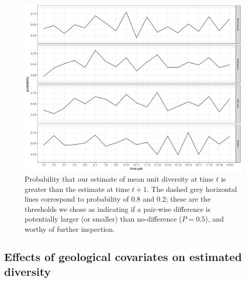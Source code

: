 \documentclass[12pt,letterpaper]{article}
\begin{document}
\begin{figure}[ht]
  \centering
  \includegraphics[width=\textwidth,height=0.5\textheight,keepaspectratio=true]{figure/unitdiv_diff}
  \caption{Probability that our estimate of mean unit diversity at time \(t\) is greater than the estimate at time \(t + 1\). The dashed grey horizontal lines correspond to probability of 0.8 and 0.2; these are the thresholds we chose as indicating if a pair-wise difference is potentially larger (or smaller) than no-difference (\(P = 0.5\)), and worthy of further inspection.}
  \label{fig:diff_div}
\end{figure}




\subsection{Effects of geological covariates on estimated diversity}
\end{document}
